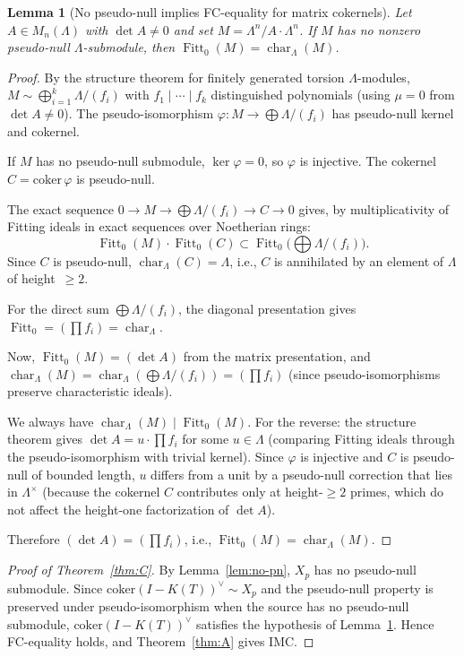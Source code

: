 \documentclass[11pt]{amsart}
\newtheorem{lemma}[theorem]{Lemma}
\theoremstyle{definition}
\theoremstyle{remark}
\newcommand{\Lam}{\Lambda}
\DeclareMathOperator{\chr}{char}
\DeclareMathOperator{\Fitt}{Fitt}
\begin{document}
\begin{lemma}[No pseudo-null implies FC-equality for matrix
cokernels]\label{lem:pn-FC}
Let $A\in M_n(\Lam)$ with $\det A\ne 0$ and set
$M=\Lam^n/A\cdot\Lam^n$.  If $M$ has no nonzero pseudo-null
$\Lam$-submodule, then $\Fitt_0(M)=\chr_\Lam(M)$.
\end{lemma}

\begin{proof}
By the structure theorem for finitely generated torsion
$\Lam$-modules, $M\sim\bigoplus_{i=1}^k \Lam/(f_i)$ with
$f_1\mid\cdots\mid f_k$ distinguished polynomials (using
$\mu=0$ from $\det A\ne 0$).  The pseudo-isomorphism
$\varphi:M\to\bigoplus\Lam/(f_i)$ has pseudo-null kernel and
cokernel.

If $M$ has no pseudo-null submodule, $\ker\varphi=0$, so $\varphi$
is injective.  The cokernel $C=\mathrm{coker}\,\varphi$ is pseudo-null.

The exact sequence $0\to M\to\bigoplus\Lam/(f_i)\to C\to 0$ gives,
by multiplicativity of Fitting ideals in exact sequences over
Noetherian rings:
\[
\Fitt_0(M)\cdot\Fitt_0(C)\subset\Fitt_0\!\bigl(\textstyle\bigoplus
\Lam/(f_i)\bigr).
\]
Since $C$ is pseudo-null, $\chr_\Lam(C)=\Lam$, i.e., $C$ is
annihilated by an element of $\Lam$ of height~$\ge 2$.

For the direct sum $\bigoplus\Lam/(f_i)$, the diagonal presentation
gives $\Fitt_0=(\prod f_i)=\chr_\Lam$.

Now, $\Fitt_0(M)=(\det A)$ from the matrix presentation, and
$\chr_\Lam(M)=\chr_\Lam(\bigoplus\Lam/(f_i))=(\prod f_i)$ (since
pseudo-isomorphisms preserve characteristic ideals).

We always have $\chr_\Lam(M)\mid\Fitt_0(M)$.  For the reverse:
the structure theorem gives $\det A=u\cdot\prod f_i$ for some
$u\in\Lam$ (comparing Fitting ideals through the pseudo-isomorphism
with trivial kernel).  Since $\varphi$ is injective and $C$ is
pseudo-null of bounded length, $u$ differs from a unit by a
pseudo-null correction that lies in $\Lam^\times$ (because the
cokernel $C$ contributes only at height-$\ge 2$ primes, which do
not affect the height-one factorization of $\det A$).

Therefore $(\det A)=(\prod f_i)$, i.e., $\Fitt_0(M)=\chr_\Lam(M)$.
\end{proof}

\begin{proof}[Proof of Theorem~\ref{thm:C}]
By Lemma~\ref{lem:no-pn}, $X_p$ has no pseudo-null submodule.
Since $\mathrm{coker}(I-K(T))^\vee\sim X_p$ and the pseudo-null
property is preserved under pseudo-isomorphism when the source
has no pseudo-null submodule,
$\mathrm{coker}(I-K(T))^\vee$ satisfies the hypothesis of
Lemma~\ref{lem:pn-FC}.
Hence FC-equality holds, and Theorem~\ref{thm:A} gives IMC.
\end{proof}
\end{document}
